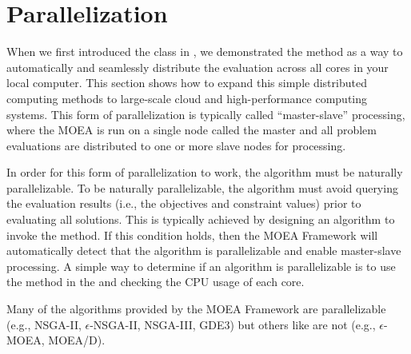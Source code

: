 %
%

\chapter{Parallelization}
\label{chpt:parallelization}

When we first introduced the  class in , we demonstrated the  method as a way to automatically and seamlessly distribute the evaluation across all cores in your local computer.  This section shows how to expand this simple distributed computing methods to large-scale cloud and high-performance computing systems.  This form of parallelization is typically called ``master-slave'' processing, where the MOEA is run on a single node called the master and all problem evaluations are distributed to one or more slave nodes for processing.

In order for this form of parallelization to work, the algorithm must be naturally parallelizable.  To be naturally parallelizable, the algorithm must avoid querying the evaluation results (i.e., the objectives and constraint values) prior to evaluating all solutions.  This is typically achieved by designing an algorithm to invoke the  method.  If this condition holds, then the MOEA Framework will automatically detect that the algorithm is parallelizable and enable master-slave processing.  A simple way to determine if an algorithm is parallelizable is to use the  method in the  and checking the CPU usage of each core. 

Many of the algorithms provided by the MOEA Framework are parallelizable (e.g., NSGA-II, $\epsilon$-NSGA-II, NSGA-III, GDE3) but others like are not (e.g., $\epsilon$-MOEA, MOEA/D).

